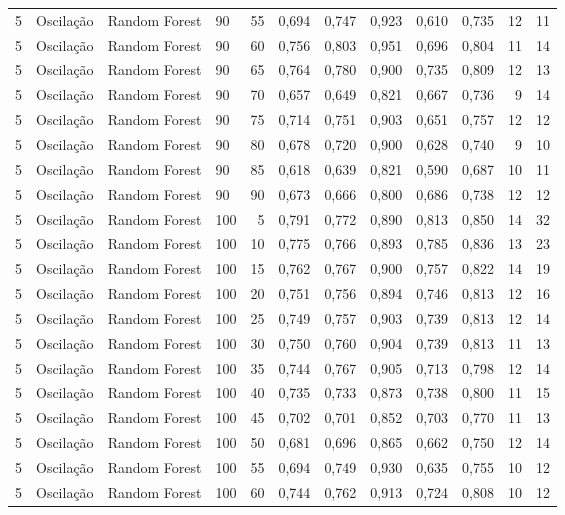 \begin{longtable}{ccclrrrrrrrr}
5 & Oscilação & Random Forest & 90 & 55 & 0,694 & 0,747 & 0,923 & 0,610 & 0,735 & 12 & 11 \\
5 & Oscilação & Random Forest & 90 & 60 & 0,756 & 0,803 & 0,951 & 0,696 & 0,804 & 11 & 14 \\
5 & Oscilação & Random Forest & 90 & 65 & 0,764 & 0,780 & 0,900 & 0,735 & 0,809 & 12 & 13 \\
5 & Oscilação & Random Forest & 90 & 70 & 0,657 & 0,649 & 0,821 & 0,667 & 0,736 & 9 & 14 \\
5 & Oscilação & Random Forest & 90 & 75 & 0,714 & 0,751 & 0,903 & 0,651 & 0,757 & 12 & 12 \\
5 & Oscilação & Random Forest & 90 & 80 & 0,678 & 0,720 & 0,900 & 0,628 & 0,740 & 9 & 10 \\
5 & Oscilação & Random Forest & 90 & 85 & 0,618 & 0,639 & 0,821 & 0,590 & 0,687 & 10 & 11 \\
5 & Oscilação & Random Forest & 90 & 90 & 0,673 & 0,666 & 0,800 & 0,686 & 0,738 & 12 & 12 \\
5 & Oscilação & Random Forest & 100 & 5 & 0,791 & 0,772 & 0,890 & 0,813 & 0,850 & 14 & 32 \\
5 & Oscilação & Random Forest & 100 & 10 & 0,775 & 0,766 & 0,893 & 0,785 & 0,836 & 13 & 23 \\
5 & Oscilação & Random Forest & 100 & 15 & 0,762 & 0,767 & 0,900 & 0,757 & 0,822 & 14 & 19 \\
5 & Oscilação & Random Forest & 100 & 20 & 0,751 & 0,756 & 0,894 & 0,746 & 0,813 & 12 & 16 \\
5 & Oscilação & Random Forest & 100 & 25 & 0,749 & 0,757 & 0,903 & 0,739 & 0,813 & 12 & 14 \\
5 & Oscilação & Random Forest & 100 & 30 & 0,750 & 0,760 & 0,904 & 0,739 & 0,813 & 11 & 13 \\
5 & Oscilação & Random Forest & 100 & 35 & 0,744 & 0,767 & 0,905 & 0,713 & 0,798 & 12 & 14 \\
5 & Oscilação & Random Forest & 100 & 40 & 0,735 & 0,733 & 0,873 & 0,738 & 0,800 & 11 & 15 \\
5 & Oscilação & Random Forest & 100 & 45 & 0,702 & 0,701 & 0,852 & 0,703 & 0,770 & 11 & 13 \\
5 & Oscilação & Random Forest & 100 & 50 & 0,681 & 0,696 & 0,865 & 0,662 & 0,750 & 12 & 14 \\
5 & Oscilação & Random Forest & 100 & 55 & 0,694 & 0,749 & 0,930 & 0,635 & 0,755 & 10 & 12 \\
5 & Oscilação & Random Forest & 100 & 60 & 0,744 & 0,762 & 0,913 & 0,724 & 0,808 & 10 & 12 \\

\end{longtable}
